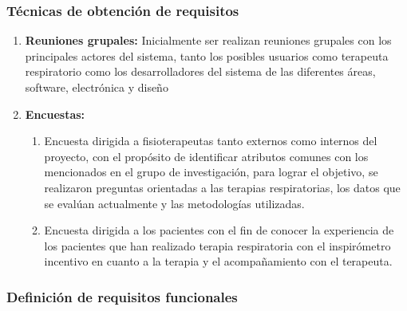 \documentclass[12pt]{article}
\begin{document}
\subsubsection{Técnicas de obtención de requisitos}

\begin{enumerate}
    \item \textbf{Reuniones grupales:} Inicialmente ser realizan reuniones grupales con los principales actores del sistema, tanto los posibles usuarios como terapeuta respiratorio como los desarrolladores del sistema de las diferentes áreas, software, electrónica y diseño
    \item \textbf{Encuestas:} 
        \begin{enumerate}
            \item Encuesta dirigida a fisioterapeutas tanto externos como internos del proyecto, con el propósito de identificar atributos comunes con los mencionados en el grupo de investigación, para lograr el objetivo, se realizaron preguntas orientadas a las terapias respiratorias, los datos que se evalúan actualmente y las metodologías utilizadas.
            \item Encuesta dirigida a los pacientes con el fin de conocer la experiencia de los pacientes que han realizado terapia respiratoria con el inspirómetro incentivo en cuanto a la terapia y el acompañamiento con el terapeuta.
        \end{enumerate}
    
    
\end{enumerate}




\subsubsection{Definición de requisitos funcionales}

\end{document}
